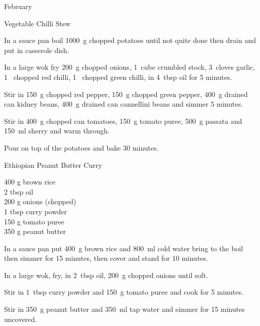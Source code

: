 \begin{menu}{February}
\begin{recipe}{2}{Vegetable Chilli Stew}
    \begin{instructions}
    \item 
        In a sauce pan boil
        1000~g chopped potatoes
        until not quite done
        then drain and put in casserole dish.
      \item 
        In a large wok fry
        200~g chopped onions,
        1~cube crumbled stock,
        3~cloves  garlic,
        1~ chopped red chilli,
        1~ chopped green chilli,
        in
        4~tbsp  oil
        for 5 minutes.
      \item 
        Stir in
        150~g chopped red pepper,
        150~g chopped green pepper,
        400~g drained can kidney beans,
        400~g drained can cannellini beans
        and simmer 5 minutes.
      \item 
        Stir in
        400~g chopped can tomatoes,
        150~g  tomato puree,
        500~g  passata
        and
        150~ml  sherry
        and warm through.
      \item 
        Pour on top of the potatoes
        and bake 30 minutes.
      
    \end{instructions}
    \end{recipe}%
  
    \begin{recipe}{2}{Ethiopian Peanut Butter Curry}%
		\begin{ingredients}
		400 g brown rice  \\
	2 tbsp oil  \\
	200 g onions (chopped) \\
	1 tbsp curry powder  \\
	150 g tomato puree  \\
	350 g peanut butter  \\
	
		\end{ingredients}
	
    \begin{instructions}
    \item 
      In a
      sauce pan
      put
      400~g  brown rice
      and
      800~ml  cold water
      bring to the boil then simmer for 15 minutes,
      then cover and stand for 10 minutes.
    \item 
        In a large wok,
        fry,
        in 2~tbsp  oil,
        200~g chopped onions
        until soft.
      \item 
        Stir in
        1~tbsp  curry powder
        and
        150~g  tomato puree
        and cook for 5 minutes.
      \item 
        Stir in
        350~g  peanut butter
        and
        350~ml  tap water
        and simmer for 15 minutes uncovered.
      

\end{instructions}
\end{recipe}
\end{menu}

